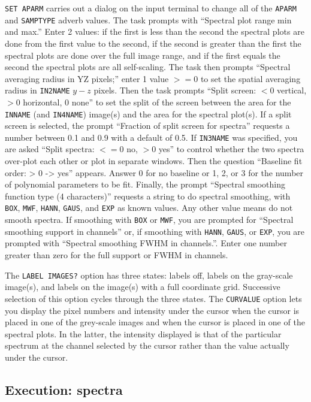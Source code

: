 \documentclass[twoside]{article}
\newcommand{\Hi}[1]{\textcolor{hicol}{#1}}
\begin{document}
{\tt SET APARM} carries out a dialog on the input terminal to change
all of the {\tt APARM} and {\tt SAMPTYPE} adverb values.  The task
prompts with ``Spectral plot range min and max.''  Enter 2 values: if
the first is less than the second the spectral plots are done from the
first value to the second, if the second is greater than the first the
spectral plots are done over the full image range, and if the first
equals the second the spectral plots are all self-scaling.  The
task then prompts ``Spectral averaging radius in YZ pixels;'' enter 1
value $>= 0$ to set the spatial averaging radius in {\tt IN2NAME}
$y-z$ pixels.  Then the task prompts ``Split screen: $< 0$ vertical,
$> 0$ horizontal, 0 none'' to set the split of the screen between the
area for the {\tt INNAME} (and {\tt IN4NAME}) image(s) and the area
for the spectral plot(s).  If a split screen is selected, the prompt
``Fraction of split screen for spectra'' requests a number between 0.1
and 0.9 with a default of 0.5.  If {\tt IN3NAME} was specified, you
are asked ``Split spectra: $<= 0$ no, $> 0$ yes'' to control whether
the two spectra over-plot each other or plot in separate windows.
Then the question ``Baseline fit order: > 0 -> yes'' appears.  Answer
0 for no baseline or 1, 2, or 3 for the number of polynomial parameters
to be fit.  Finally, the prompt ``Spectral smoothing function type (4
characters)'' requests a string to do spectral smoothing, with {\tt
  BOX}, {\tt MWF}, {\tt HANN}, {\tt GAUS}, and {\tt EXP} as known
values.  Any other value means do not smooth spectra.  If smoothing
with {\tt BOX} or {\tt MWF}, you are prompted for ``Spectral smoothing
support in channels'' or, if smoothing with {\tt HANN}, {\tt GAUS}, or
{\tt EXP}, you are prompted with ``Spectral smoothing FWHM in
channels.''.  Enter one number greater than zero for the full support
or FWHM in channels.

\Hi{The {\tt LABEL IMAGES?} option has three states: labels off,
  labels on the gray-scale image(s), and labels on the image(s) with
  a full coordinate grid.  Successive selection of this option cycles
  through the three states.  The {\tt CURVALUE} option lets you
  display the pixel numbers and intensity under the cursor when the
  cursor is placed in one of the grey-scale images and when the cursor
  is placed in one of the spectral plots.  In the latter, the
  intensity displayed is that of the particular spectrum at the
  channel selected by the cursor rather than the value actually under
  the cursor.}

\subsection{Execution: spectra}
\end{document}
